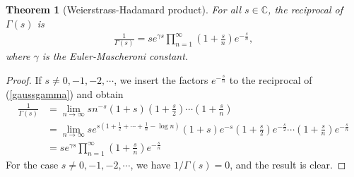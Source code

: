 \documentclass{article}
\numberwithin{equation}{section}
\newcommand{\bbC}{\mathbb{C}}
\theoremstyle{plain}
\newtheorem{theorem}{Theorem}[section]
\theoremstyle{definition}
\begin{document}
\begin{theorem}[Weierstrass-Hadamard product] For all $s\in\bbC$, the reciprocal of $\Gamma(s)$ is
\begin{align*}
	\frac{1}{\Gamma(s)}=se^{\gamma s}\prod_{n=1}^\infty\left(1+\frac{s}{n}\right)e^{-\frac{s}{n}},
\end{align*}
where $\gamma$ is the Euler-Mascheroni constant.
\end{theorem}
\begin{proof}
If $s\neq 0,-1,-2,\cdots$, we insert the factors $e^{-\frac{s}{n}}$ to the reciprocal of (\ref{gaussgamma}) and obtain
\begin{align*}
	\frac{1}{\Gamma(s)}&=\lim_{n\to\infty}sn^{-s}\left(1+s\right)\left(1+\frac{s}{2}\right)\cdots\left(1+\frac{s}{n}\right)\\
	&=\lim_{n\to\infty}se^{s\left(1+\frac{1}{2}+\cdots+\frac{1}{n}-\log n\right)}\left(1+s\right)e^{-s}\left(1+\frac{s}{2}\right)e^{-\frac{s}{2}}\cdots\left(1+\frac{s}{n}\right)e^{-\frac{s}{n}}\\
	&=se^{\gamma s}\prod_{n=1}^\infty\left(1+\frac{s}{n}\right)e^{-\frac{s}{n}}
\end{align*}
For the case $s\neq 0,-1,-2,\cdots$, we have $1/\Gamma(s)=0$, and the result is clear.
\end{proof}
\end{document}
